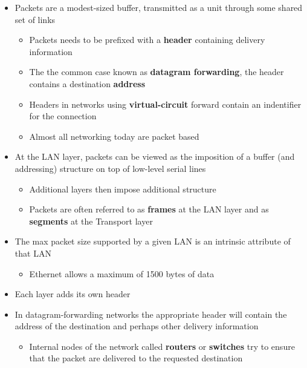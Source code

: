 \documentclass[11pt]{article}
\providecommand{\tightlist}{%
      \setlength{\itemsep}{0pt}\setlength{\parskip}{0pt}}
\begin{document}
\begin{itemize}
\item
  Packets are a modest-sized buffer, transmitted as a unit through some
  shared set of links

  \begin{itemize}
  \tightlist
  \item
    Packets needs to be prefixed with a \textbf{header} containing
    delivery information
  \item
    The the common case known as \textbf{datagram forwarding}, the
    header contains a destination \textbf{address}
  \item
    Headers in networks using \textbf{virtual-circuit} forward contain
    an indentifier for the connection
  \item
    Almost all networking today are packet based
  \end{itemize}
\item
  At the LAN layer, packets can be viewed as the imposition of a buffer
  (and addressing) structure on top of low-level serial lines

  \begin{itemize}
  \tightlist
  \item
    Additional layers then impose additional structure
  \item
    Packets are often referred to as \textbf{frames} at the LAN layer
    and as \textbf{segments} at the Transport layer
  \end{itemize}
\item
  The max packet size supported by a given LAN is an intrinsic attribute
  of that LAN

  \begin{itemize}
  \tightlist
  \item
    Ethernet allows a maximum of 1500 bytes of data
  \end{itemize}
\item
  Each layer adds its own header
\item
  In datagram-forwarding networks the appropriate header will contain
  the address of the destination and perhaps other delivery information

  \begin{itemize}
  \tightlist
  \item
    Internal nodes of the network called \textbf{routers} or
    \textbf{switches} try to ensure that the packet are delivered to the
    requested destination
  \end{itemize}
\end{itemize}
\end{document}
